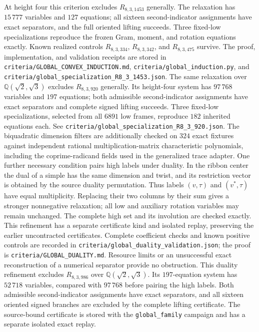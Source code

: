 At height four this criterion excludes $R_{8,3,1453}$ generally. The
relaxation has $15\,777$ variables and $127$ equations; all sixteen
second-indicator assignments have exact separators, and the full oriented
lifting succeeds. Three fixed-low specializations reproduce the frozen
Gram, moment, and rotation equations exactly. Known realized controls
$R_{8,3,334}$, $R_{8,3,342}$, and $R_{8,3,475}$ survive. The proof,
implementation, and validation receipts are stored in
\texttt{criteria/GLOBAL\_CONVEX\_INDUCTION.md},
\texttt{criteria/global\_induction.py}, and
\texttt{criteria/global\_specialization\_R8\_3\_1453.json}.
The same relaxation over $\mathbb Q(\sqrt2,\sqrt3)$ excludes
$R_{8,3,920}$ generally.  Its height-four system has $97\,768$ variables
and $197$ equations; both admissible second-indicator assignments have
exact separators and complete signed lifting succeeds.  Three fixed-low
specializations, selected from all $6891$ low frames, reproduce $182$
inherited equations each.  See
\texttt{criteria/global\_specialization\_R8\_3\_920.json}.
The biquadratic dimension filters are additionally checked on $324$
exact fixtures against independent rational multiplication-matrix
characteristic polynomials, including the coprime-radicand fields used
in the generalized trace adapter.
One further necessary condition pairs high labels under duality.  In the
ribbon center the dual of a simple has the same dimension and twist, and
its restriction vector is obtained by the source duality permutation.
Thus labels $(v,\tau)$ and $(v^*,\tau)$ have equal multiplicity. Replacing
their two columns by their sum gives a stronger nonnegative relaxation;
all low and auxiliary rotation variables may remain unchanged. The
complete high set and its involution are checked exactly. This refinement
has a separate certificate kind and isolated replay, preserving the earlier
uncontracted certificates. Complete coefficient checks and known positive
controls are recorded in
\texttt{criteria/global\_duality\_validation.json}; the proof is
\texttt{criteria/GLOBAL\_DUALITY.md}. Resource limits or an unsuccessful
exact reconstruction of a numerical separator provide no obstruction.
This duality refinement excludes $R_{8,3,986}$ over
$\mathbb Q(\sqrt2,\sqrt3)$. Its $197$-equation system has $52\,718$
variables, compared with $97\,768$ before pairing the high labels. Both
admissible second-indicator assignments have exact separators, and all
sixteen oriented signed branches are excluded by the complete lifting
certificate. The source-bound certificate is stored with the
\texttt{global\_family} campaign and has a separate isolated exact replay.
